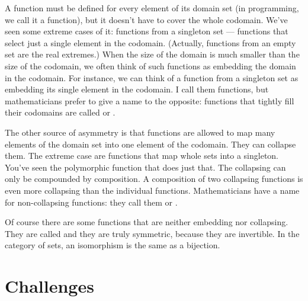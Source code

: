 A function must be defined for every element of its domain set (in
programming, we call it a  function), but it doesn't have to
cover the whole codomain. We've seen some extreme cases of it: functions
from a singleton set --- functions that select just a single element in
the codomain. (Actually, functions from an empty set are the real
extremes.) When the size of the domain is much smaller than the size of
the codomain, we often think of such functions as embedding the domain
in the codomain. For instance, we can think of a function from a
singleton set as embedding its single element in the codomain. I call
them  functions, but mathematicians prefer to give a
name to the opposite: functions that tightly fill their codomains are
called  or .

The other source of asymmetry is that functions are allowed to map many
elements of the domain set into one element of the codomain. They can
collapse them. The extreme case are functions that map whole sets into a
singleton. You've seen the polymorphic  function that does
just that. The collapsing can only be compounded by composition. A
composition of two collapsing functions is even more collapsing than the
individual functions. Mathematicians have a name for non-collapsing
functions: they call them  or .

Of course there are some functions that are neither embedding nor
collapsing. They are called  and they are truly
symmetric, because they are invertible. In the category of sets, an
isomorphism is the same as a bijection.

\section{Challenges}

